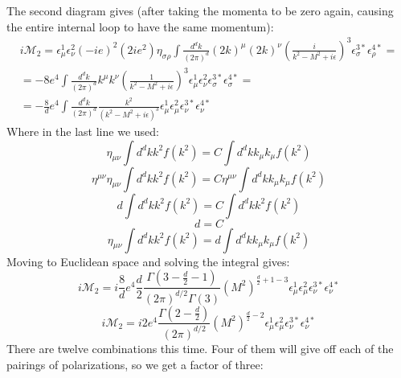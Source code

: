 \documentclass{article}
\begin{document}
The second diagram gives (after taking the momenta to be zero again, causing the entire internal loop to have the same momentum):
\begin{equation}
\begin{gathered}
    i\mathcal{M}_2 = \epsilon^1_\mu\epsilon^2_\nu (-ie)^2(2ie^2)\eta_{\sigma\rho} \int \frac{d^dk}{(2\pi)^d} (2k)^\mu(2k)^\nu \left(\frac{i}{k^2 - M^2 + i\epsilon}\right)^3 \epsilon^{3*}_\sigma\epsilon^{4*}_\rho = \\ =
     -8e^4\int \frac{d^dk}{(2\pi)^d} k^\mu k^\nu \left(\frac{1}{k^2 - M^2 + i\epsilon}\right)^3 \epsilon^1_\mu\epsilon^2_\nu \epsilon^{3*}_\sigma\epsilon^{4*}_\sigma = \\ =
    -\frac{8}{d}e^4 \int \frac{d^dk}{(2\pi)^d} \frac{k^2 }{\left(k^2 - M^2 + i\epsilon\right)^3} \epsilon^1_\mu\epsilon^2_\mu \epsilon^{3*}_\nu\epsilon^{4*}_\nu
\end{gathered}
\end{equation}
Where in the last line we used:
\begin{equation}
    \eta_{\mu\nu} \int d^dk k^2 f(k^2) =  C \int d^dk k_\mu k_\mu f(k^2)
\end{equation}
\begin{equation}
    \eta^{\mu\nu} \eta_{\mu\nu} \int d^dk k^2 f(k^2) =  C \eta^{\mu\nu}\int d^dk k_\mu k_\mu f(k^2)
\end{equation}
\begin{equation}
    d \int d^dk k^2 f(k^2) =  C\int d^dk k^2 f(k^2)
\end{equation}
\begin{equation}
    d = C
\end{equation}
\begin{equation}
    \eta_{\mu\nu} \int d^dk k^2 f(k^2) =  d \int d^dk k_\mu k_\mu f(k^2)
\end{equation}
Moving to Euclidean space and solving the integral gives:
\begin{equation}
    i\mathcal{M}_2 = i\frac{8}{d}e^4 \frac{d}{2} \frac{\Gamma\left(3 - \frac{d}{2} - 1\right)}{(2\pi)^{d/2}\Gamma(3)}(M^2)^{\frac{d}{2} + 1 - 3}\epsilon^1_\mu\epsilon^2_\mu\epsilon^{3*}_\nu\epsilon^{4*}_\nu
\end{equation}
\begin{equation}
    i\mathcal{M}_2 = i2e^4 \frac{\Gamma\left(2 - \frac{d}{2}\right)}{(2\pi)^{d/2}}(M^2)^{\frac{d}{2} - 2}\epsilon^1_\mu\epsilon^2_\mu\epsilon^{3*}_\nu\epsilon^{4*}_\nu
\end{equation}
There are twelve combinations this time. Four of them will give off each of the pairings of polarizations, so we get a factor of three:
\end{document}
